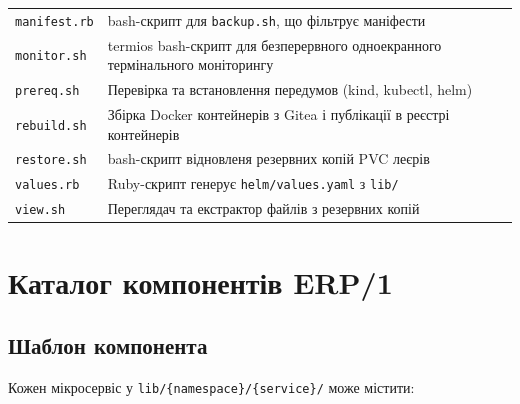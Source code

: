 \documentclass[12pt,a4paper]{article}
\begin{document}
\begin{longtable}{L{3cm} L{12cm}}
\texttt{manifest.rb} & bash-скрипт для \texttt{backup.sh}, що фільтрує маніфести\\[2pt]
\texttt{monitor.sh} & termios bash-скрипт для безперервного одноекранного термінального моніторингу\\[2pt]
\texttt{prereq.sh} & Перевірка та встановлення передумов (kind, kubectl, helm) \\[2pt]
\texttt{rebuild.sh} & Збірка Docker контейнерів з Gitea і публікації в реєстрі контейнерів \\[2pt]
\texttt{restore.sh} & bash-скрипт відновленя резервних копій PVC леєрів\\[2pt]
\texttt{values.rb} & Ruby-скрипт генерує \texttt{helm/values.yaml} з \texttt{lib/} \\[2pt]
\texttt{view.sh} & Переглядач та екстрактор файлів з резервних копій \\[2pt]
\end{longtable}


\newpage
\section{Каталог компонентів ERP/1}

\subsection{Шаблон компонента}

Кожен мікросервіс у \texttt{lib/\{namespace\}/\{service\}/} може містити:
\end{document}
